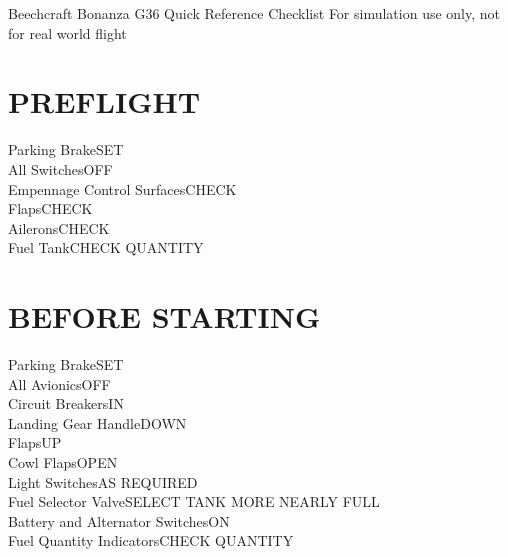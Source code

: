 \documentclass{article}
\begin{document}
\begin{center}
    {\fontsize{25}{70}\selectfont Beechcraft Bonanza G36}
    \break
    {\fontsize{20.74}{70}\selectfont Quick Reference Checklist}
    \break
    \color{Red}
    {\fontsize{10}{70}\selectfont For simulation use only, not for real world flight}
\end{center}
\vspace{-2em}
\begin{multicols*}{2}
\section*{PREFLIGHT}
Parking Brake\dotfill SET\\
All Switches\dotfill OFF\\
Empennage Control Surfaces\dotfill CHECK\\
Flaps\dotfill CHECK\\
Ailerons\dotfill CHECK\\
Fuel Tank\dotfill CHECK QUANTITY
\section*{BEFORE STARTING}
Parking Brake\dotfill SET\\
All Avionics\dotfill OFF\\
Circuit Breakers\dotfill IN\\
Landing Gear Handle\dotfill DOWN\\
Flaps\dotfill UP\\
Cowl Flaps\dotfill OPEN\\
Light Switches\dotfill AS REQUIRED\\
Fuel Selector Valve\dotfill SELECT TANK MORE NEARLY FULL\\
Battery and Alternator Switches\dotfill ON\\
Fuel Quantity Indicators\dotfill CHECK QUANTITY

\end{multicols*}
\end{document}
